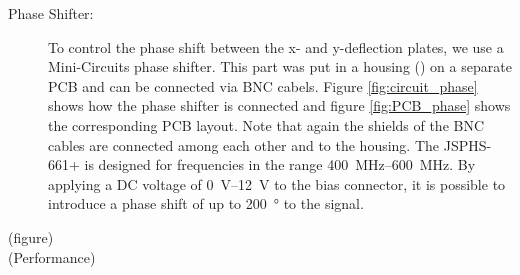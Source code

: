 \begin{description}
	\item[Phase Shifter:] To control the phase shift between the x- and y-deflection plates, we use a Mini-Circuits \cite{JSPHS-661} phase shifter. This part was put in a  housing (\cite{Hammond1455D601RD }) on a separate PCB and can be connected via BNC cabels. Figure \ref{fig:circuit_phase} shows how the phase shifter is connected and figure \ref{fig:PCB_phase} shows the corresponding PCB layout. Note that again the shields of the BNC cables are connected among each other and to the housing. The JSPHS-661+ is designed for frequencies in the range \SIrange{400}{600}{\mega\hertz}. By applying a DC voltage of \SIrange{0}{12}{\volt} to the bias connector, it is possible to introduce a phase shift of up to \SI{200}{\degree} to the signal.
	
\end{description}

(figure)\\
(Performance)


